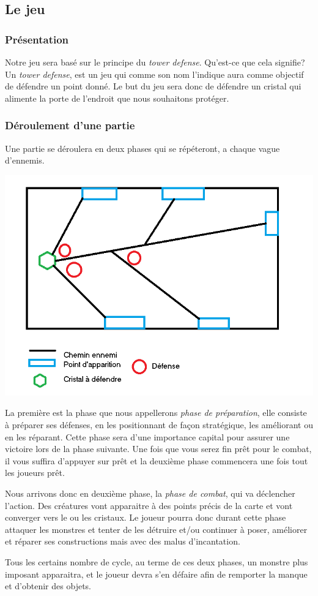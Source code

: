 \documentclass[a4paper, 12pt]{article}
\begin{document}
	\subsection{Le jeu}
		\subsubsection{Présentation}
		\par Notre jeu sera basé sur le principe du \textit{tower defense}. Qu'est-ce que 			cela signifie? Un \textit{tower defense}, est un jeu qui comme son nom l'indique 			aura comme objectif de défendre un point donné. Le but du jeu sera donc de défendre 		un cristal qui alimente la porte de l'endroit que nous souhaitons protéger.  
		\subsubsection{Déroulement d'une partie}
		Une partie se déroulera en deux phases qui se répéteront, a chaque vague d'ennemis.\\
		\centerline{\includegraphics[scale=0.55]{Plan.png}}
		\par La première est la phase que nous appellerons \textit{phase de préparation}, elle consiste à préparer ses défenses, en les positionnant de façon stratégique, les améliorant ou en les réparant. Cette phase sera d'une importance capital pour assurer une victoire lors de la phase suivante. Une fois que vous serez fin prêt pour le combat, il vous suffira d'appuyer sur prêt et la deuxième phase commencera une fois tout les joueurs prêt.
		\par Nous arrivons donc en deuxième phase, la \textit{phase de combat}, qui va déclencher l'action. Des créatures vont apparaitre à des points précis de la carte et vont converger vers le ou les cristaux. Le joueur pourra donc durant cette phase attaquer les monstres et tenter de les détruire et/ou continuer à poser, améliorer et réparer ses constructions mais avec des malus d'incantation.
		\par Tous les certains nombre de cycle, au terme de ces deux phases, un monstre plus imposant apparaitra, et le joueur devra s'en défaire afin de remporter la manque et d'obtenir des objets.
\end{document}
